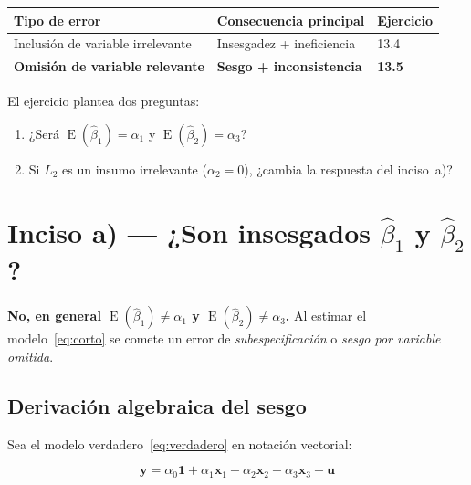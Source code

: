 \documentclass[12pt, letterpaper]{article}
\newcommand{\E}{\operatorname{E}}
\begin{document}
\begin{center}
\renewcommand{\arraystretch}{1.3}
\small
\begin{tabular}{lll}
\toprule
\textbf{Tipo de error} & \textbf{Consecuencia principal} & \textbf{Ejercicio} \\
\midrule
Inclusión de variable irrelevante & Insesgadez + ineficiencia & 13.4 \\
\textbf{Omisión de variable relevante} & \textbf{Sesgo + inconsistencia} & \textbf{13.5} \\
\bottomrule
\end{tabular}
\end{center}

El ejercicio plantea dos preguntas:

\begin{enumerate}[leftmargin=1.8em]
  \item[\textbf{a)}] ¿Será $\E(\hat{\beta}_1) = \alpha_1$ y
    $\E(\hat{\beta}_2) = \alpha_3$?
  \item[\textbf{b)}] Si $L_2$ es un insumo irrelevante ($\alpha_2 = 0$),
    ¿cambia la respuesta del inciso~a)?
\end{enumerate}

\section{Inciso a) --- ¿Son insesgados \texorpdfstring{$\hat{\beta}_1$}{b1}
  y \texorpdfstring{$\hat{\beta}_2$}{b2}?}

\textbf{No, en general $\E(\hat{\beta}_1) \neq \alpha_1$ y
$\E(\hat{\beta}_2) \neq \alpha_3$.} Al estimar el modelo~\eqref{eq:corto}
se comete un error de \textit{subespecificación} o \textit{sesgo por variable
omitida}.

\subsection{Derivación algebraica del sesgo}

Sea el modelo verdadero~\eqref{eq:verdadero} en notación vectorial:

\begin{equation}
  \mathbf{y} = \alpha_0\mathbf{1} + \alpha_1\mathbf{x}_1
             + \alpha_2\mathbf{x}_2 + \alpha_3\mathbf{x}_3 + \mathbf{u}
\end{equation}
\end{document}
